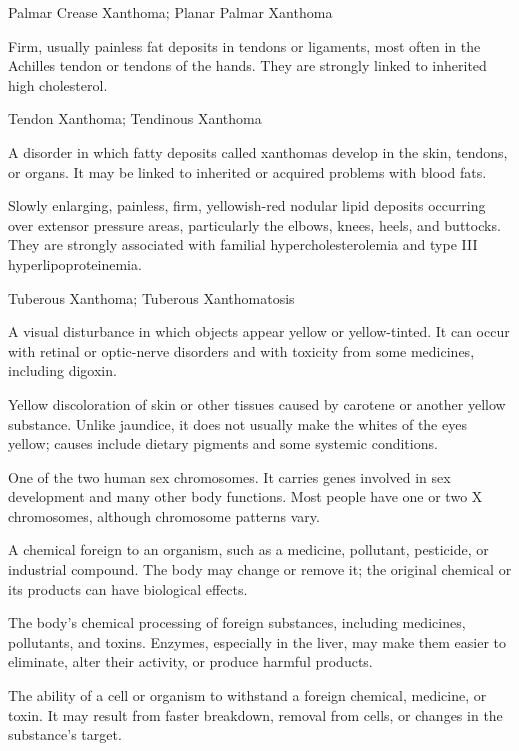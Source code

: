 \synonyms
Palmar Crease Xanthoma; Planar Palmar Xanthoma

 Firm, usually painless fat deposits in tendons or ligaments, most often in the Achilles tendon or tendons of the hands. They are strongly linked to inherited high cholesterol.

\synonyms
Tendon Xanthoma; Tendinous Xanthoma

 A disorder in which fatty deposits called xanthomas develop in the skin, tendons, or organs. It may be linked to inherited or acquired problems with blood fats.

 Slowly enlarging, painless, firm, yellowish-red nodular lipid deposits occurring over extensor pressure areas, particularly the elbows, knees, heels, and buttocks. They are strongly associated with familial hypercholesterolemia and type III hyperlipoproteinemia.

\synonyms
Tuberous Xanthoma; Tuberous Xanthomatosis

 A visual disturbance in which objects appear yellow or yellow-tinted. It can occur with retinal or optic-nerve disorders and with toxicity from some medicines, including digoxin.

 Yellow discoloration of skin or other tissues caused by carotene or another yellow substance. Unlike jaundice, it does not usually make the whites of the eyes yellow; causes include dietary pigments and some systemic conditions.

 One of the two human sex chromosomes. It carries genes involved in sex development and many other body functions. Most people have one or two X chromosomes, although chromosome patterns vary.

 A chemical foreign to an organism, such as a medicine, pollutant, pesticide, or industrial compound. The body may change or remove it; the original chemical or its products can have biological effects.

 The body’s chemical processing of foreign substances, including medicines, pollutants, and toxins. Enzymes, especially in the liver, may make them easier to eliminate, alter their activity, or produce harmful products.

 The ability of a cell or organism to withstand a foreign chemical, medicine, or toxin. It may result from faster breakdown, removal from cells, or changes in the substance’s target.

